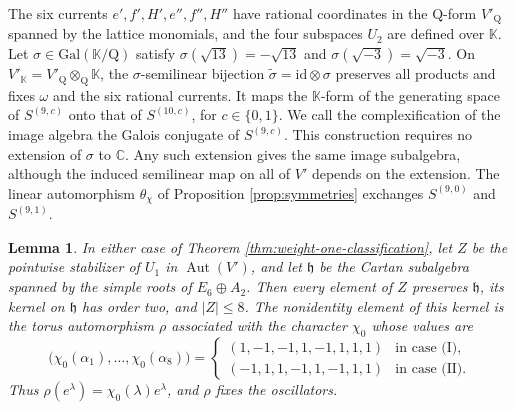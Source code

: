 \documentclass[leqno]{article}
\newcommand{\Cbb}{\ensuremath{\mathbb{C}}}
\newcommand{\K}{\ensuremath{\mathbb{K}}}
\newcommand{\Q}{\mathrm{Q}}
\renewcommand{\leq}{\ensuremath{\leqslant}}
\newcommand{\ot}{\otimes}
\newtheorem{lemma}[thm]{Lemma}
\numberwithin{equation}{section}
\begin{document}
The six currents $e', f', H', e'', f'', H''$ have rational coordinates in the $\Q$-form $V'_\Q$ spanned by the lattice monomials, and the four subspaces $U_2$ are defined over $\K$. Let $\sigma \in \mathrm{Gal}(\K/\Q)$ satisfy $\sigma(\sqrt{13}) = -\sqrt{13}$ and $\sigma(\sqrt{-3}) = \sqrt{-3}$. On $V'_\K = V'_\Q \ot_\Q \K$, the $\sigma$-semilinear bijection $\tilde\sigma = \mathrm{id} \ot \sigma$ preserves all products and fixes $\omega$ and the six rational currents. It maps the $\K$-form of the generating space of $S^{(9,c)}$ onto that of $S^{(10,c)}$, for $c \in \{0,1\}$. We call the complexification of the image algebra the Galois conjugate of $S^{(9,c)}$. This construction requires no extension of $\sigma$ to $\Cbb$. Any such extension gives the same image subalgebra, although the induced semilinear map on all of $V'$ depends on the extension. The linear automorphism $\theta_\chi$ of Proposition \ref{prop:symmetries} exchanges $S^{(9,0)}$ and $S^{(9,1)}$.

\begin{lemma}
\label{lem:centralizer-bound}
In either case of Theorem \ref{thm:weight-one-classification}, let $Z$ be the pointwise stabilizer of $U_1$ in $\operatorname{Aut}(V')$, and let $\mathfrak h$ be the Cartan subalgebra spanned by the simple roots of $E_6 \oplus A_2$. Then every element of $Z$ preserves $\mathfrak h$, its kernel on $\mathfrak h$ has order two, and $|Z| \leq 8$. The nonidentity element of this kernel is the torus automorphism $\rho$ associated with the character $\chi_0$ whose values are
\[
\big(\chi_0(\alpha_1),\ldots,\chi_0(\alpha_8)\big) =
\begin{cases}
(1,-1,-1,1,-1,1,1,1) & \text{in case (I)},\\
(-1,1,1,-1,1,-1,1,1) & \text{in case (II)}.
\end{cases}
\]
Thus $\rho(e^\lambda) = \chi_0(\lambda)e^\lambda$, and $\rho$ fixes the oscillators.
\end{lemma}
\end{document}
